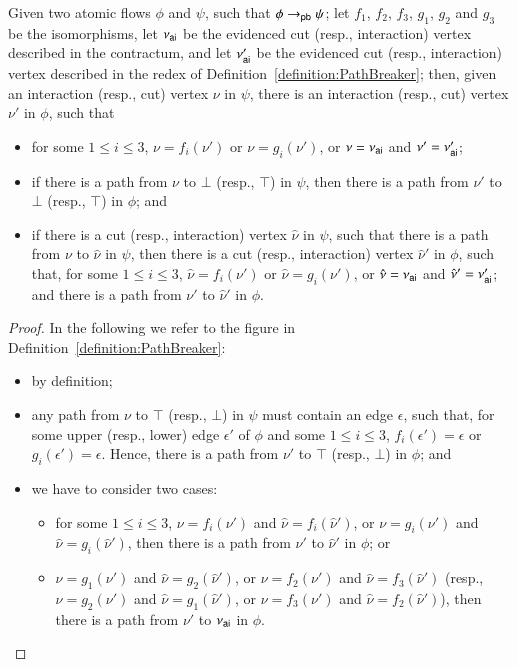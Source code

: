 \begin{lemma}\label{lemma:PathBreaker}
Given two atomic flows $\phi$ and $\psi$, such that $\phi\to_{\mathsf{pb}}\psi$; let $f_1$, $f_2$, $f_3$, $g_1$, $g_2$ and $g_3$ be the isomorphisms, let $\nu_{\mathsf{ai}}$ be the evidenced cut (resp., interaction) vertex described in the contractum, and let $\nu'_{\mathsf{ai}}$ be the evidenced cut (resp., interaction) vertex described in the redex of Definition~\ref{definition:PathBreaker}; then, given an interaction (resp., cut) vertex $\nu$ in $\psi$, there is an interaction (resp., cut) vertex $\nu'$ in $\phi$, such that
\begin{itemize}
\item for some $1\le i\le 3$, $\nu=f_i(\nu')$ or $\nu=g_i(\nu')$, or $\nu=\nu_{\mathsf{ai}}$ and $\nu'=\nu'_{\mathsf{ai}}$;
\item if there is a path from $\nu$ to $\bot$ (resp., $\top$) in $\psi$, then there is a path from $\nu'$ to $\bot$ (resp., $\top$) in $\phi$; and
\item if there is a cut (resp., interaction) vertex $\hat\nu$ in $\psi$, such that there is a path from $\nu$ to $\hat\nu$ in $\psi$, then there is a cut (resp., interaction) vertex $\hat\nu'$ in $\phi$, such that, for some $1\le i\le 3$, $\hat\nu=f_i(\nu')$ or $\hat\nu=g_i(\nu')$, or $\hat\nu=\nu_{\mathsf{ai}}$ and $\hat\nu'=\nu'_{\mathsf{ai}}$; and there is a path from $\nu'$ to $\hat\nu'$ in $\phi$.
\end{itemize}
\end{lemma}

\begin{proof}
In the following we refer to the figure in Definition~\ref{definition:PathBreaker}:
\begin{itemize}
  \item by definition;
  \item any path from $\nu$ to $\top$ (resp., $\bot$) in $\psi$ must contain an edge $\epsilon$, such that, for some upper (resp., lower) edge $\epsilon'$ of $\phi$ and some $1\le i\le 3$, $f_i(\epsilon')=\epsilon$ or $g_i(\epsilon')=\epsilon$. Hence, there is a path from $\nu'$ to $\top$ (resp., $\bot$) in $\phi$; and
 \item we have to consider two cases:
 \begin{itemize}
  \item for some $1\le i\le 3$, $\nu=f_i(\nu')$ and $\hat\nu=f_i(\hat\nu')$, or $\nu=g_i(\nu')$ and $\hat\nu=g_i(\hat\nu')$, then there is a path from $\nu'$ to $\hat\nu'$ in $\phi$; or
  \item $\nu=g_1(\nu')$ and $\hat\nu=g_2(\hat\nu')$, or $\nu=f_2(\nu')$ and $\hat\nu=f_3(\hat\nu')$ (resp., $\nu=g_2(\nu')$ and $\hat\nu=g_1(\hat\nu')$, or $\nu=f_3(\nu')$ and $\hat\nu=f_2(\hat\nu')$), then there is a path from $\nu'$ to $\nu_{\mathsf{ai}}$ in $\phi$.
 \end{itemize}
\end{itemize}
\end{proof}

